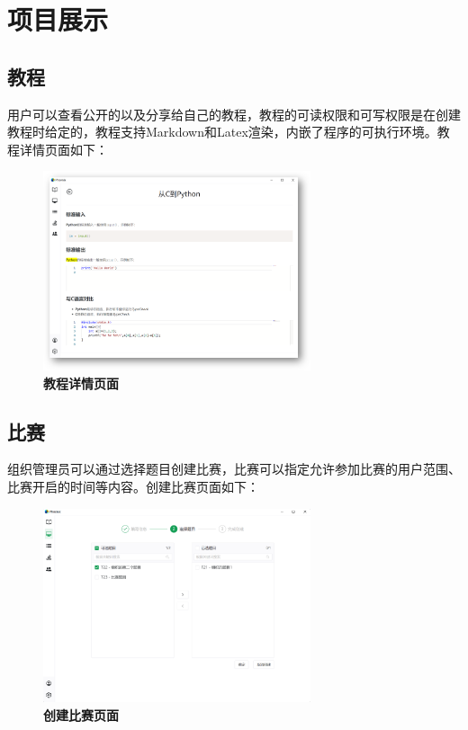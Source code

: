 \chapter{项目展示}

\section{教程}

用户可以查看公开的以及分享给自己的教程，教程的可读权限和可写权限是在创建教程时给定的，教程支持Markdown和Latex渲染，内嵌了程序的可执行环境。教程详情页面如下：

\begin{figure}[H]
    \centering
    \includegraphics[width=0.7\textwidth]{figure/tutorial1.png}
    \caption{\textbf{教程详情页面}}
    \label{fig:tutorial1}
\end{figure}

\section{比赛}

组织管理员可以通过选择题目创建比赛，比赛可以指定允许参加比赛的用户范围、比赛开启的时间等内容。创建比赛页面如下：

\begin{figure}[H]
    \centering
    \includegraphics[width=0.7\textwidth]{figure/contest1.png}
    \caption{\textbf{创建比赛页面}}
    \label{fig:contest1}
\end{figure}

